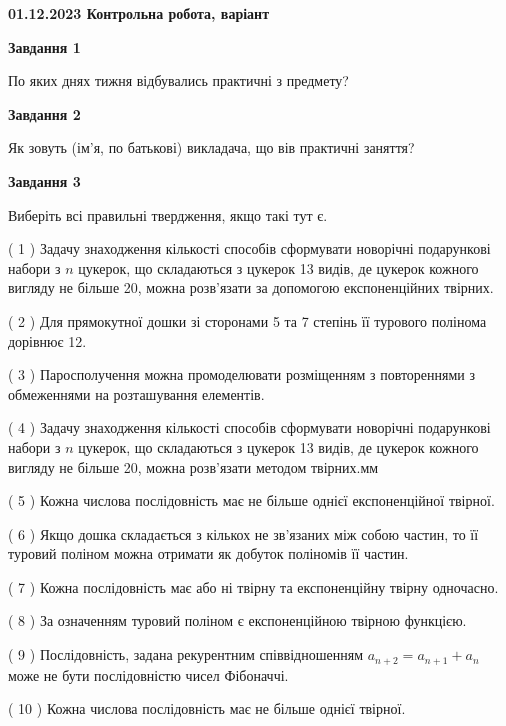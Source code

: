 \documentclass[12pt, ukrainian]{article}
\begin{document}
\begin {large}

\textbf{01.12.2023 Контрольна робота, варіант  }\par


{
{\begin {center}\textbf{Завдання 1}\end {center}}\par
По яких днях тижня відбувались практичні з предмету?\par
{\begin {center}\textbf{Завдання 2}\end {center}}\par
Як зовуть (ім'я, по батькові) викладача, що вів практичні заняття?\par
{\begin {center}\textbf{Завдання 3}\end {center}}\par
Виберіть всі правильні твердження, якщо такі тут є.\par
\vspace{2mm}
( 1 ) Задачу знаходження кількості способів сформувати новорічні подарункові набори з $n$ цукерок, що складаються з цукерок 13 видів, де цукерок кожного вигляду не більше 20, можна розв’язати за допомогою експоненційних твірних.%

( 2 ) Для прямокутної дошки зі сторонами 5 та 7 степінь її турового полінома дорівнює 12.%

( 3 ) Паросполучення можна промоделювати розміщенням з повтореннями з обмеженнями на розташування елементів.%

( 4 ) Задачу знаходження кількості способів сформувати новорічні подарункові набори з $n$ цукерок, що складаються з цукерок 13 видів, де цукерок кожного вигляду не більше 20, можна розв’язати методом твірних.мм%

( 5 ) Кожна числова послідовність має не більше однієї  експоненційної твірної.%

( 6 ) Якщо дошка складається з кількох не зв’язаних між собою частин, то її туровий поліном можна отримати як добуток поліномів її частин.%

( 7 ) Кожна послідовність має або ні твірну та експоненційну твірну одночасно.%

( 8 ) За означенням туровий поліном є експоненційною твірною функцією.%

( 9 ) Послідовність, задана рекурентним співвідношенням $a_{n+2}=a_{n+1}+a_{n}$ може не бути послідовністю чисел Фібоначчі.%

( 10 ) Кожна числова послідовність має не більше однієї твірної.%
}
\end {large}

\vspace{4mm}
\newpage
\end{document}
